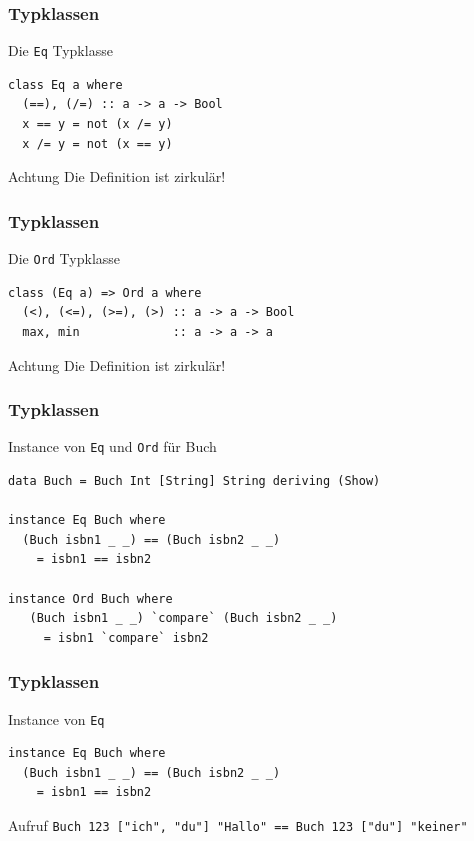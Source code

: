 \begin{frame}[fragile]
\frametitle{Typklassen}
\begin{block}{Die \lstinline|Eq| Typklasse}
\begin{lstlisting}
class Eq a where
  (==), (/=) :: a -> a -> Bool
  x == y = not (x /= y)
  x /= y = not (x == y)
\end{lstlisting}
\end{block}
\begin{alertblock}{Achtung}
Die Definition ist zirkulär!
\end{alertblock}
\end{frame}

\begin{frame}[fragile]
\frametitle{Typklassen}
\begin{block}{Die \lstinline|Ord| Typklasse}
\begin{lstlisting}
class (Eq a) => Ord a where
  (<), (<=), (>=), (>) :: a -> a -> Bool
  max, min             :: a -> a -> a
\end{lstlisting}
\end{block}
\begin{alertblock}{Achtung}
Die Definition ist zirkulär!
\end{alertblock}
\end{frame}

\begin{frame}[fragile]
\frametitle{Typklassen}
\begin{block}{Instance von \lstinline|Eq| und \lstinline|Ord| für Buch}
\begin{lstlisting}
data Buch = Buch Int [String] String deriving (Show)

instance Eq Buch where 
  (Buch isbn1 _ _) == (Buch isbn2 _ _) 
    = isbn1 == isbn2
  
instance Ord Buch where
   (Buch isbn1 _ _) `compare` (Buch isbn2 _ _) 
     = isbn1 `compare` isbn2
\end{lstlisting}
\end{block}
\end{frame}

\begin{frame}[fragile]
\frametitle{Typklassen}
\begin{block}{Instance von \lstinline|Eq|}
\begin{lstlisting}
instance Eq Buch where 
  (Buch isbn1 _ _) == (Buch isbn2 _ _) 
    = isbn1 == isbn2
\end{lstlisting}
\end{block}
\begin{block}{Aufruf}
\lstinline|Buch 123 ["ich", "du"] "Hallo" == Buch 123 ["du"] "keiner"|
\end{block}
\end{frame}

